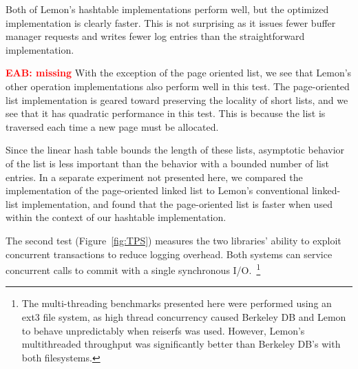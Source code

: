 \documentclass[10pt,letterpaper,twocolumn,english]{article}
\newcommand{\yad}{Lemon\xspace}
\newcommand{\eab}[1]{\textcolor{red}{\bf EAB: #1}}
\begin{document}
Both of \yad's hashtable implementations perform well, but the
optimized implementation is clearly faster.  This is not surprising as
it issues fewer buffer manager requests and writes fewer log entries
than the straightforward implementation.

\eab{missing} With the exception of the page oriented list, we see 
that \yad's other operation implementations also perform well in 
this test.  The page-oriented list implementation is
geared toward preserving the locality of short lists, and we see that
it has quadratic performance in this test.  This is because the list
is traversed each time a new page must be allocated.


Since the linear hash table bounds the length of these lists, 
asymptotic behavior of the list is less important than the 
behavior with a bounded number of list entries.  In a separate experiment
not presented here, we compared the implementation of the 
page-oriented linked list to \yad's conventional linked-list 
implementation, and found that the page-oriented list is faster 
when used within the context of our hashtable implementation.



The second test (Figure~\ref{fig:TPS}) measures the two libraries' ability to exploit
concurrent transactions to reduce logging overhead.  Both systems
can service concurrent calls to commit with a single 
synchronous I/O.~\footnote{The multi-threading benchmarks presented 
here were performed using an ext3 file system, as high thread 
concurrency caused Berkeley DB and \yad to behave unpredictably 
when reiserfs was used.  However, \yad's multithreaded throughput was 
significantly better than Berkeley DB's with both filesystems.}
\end{document}
